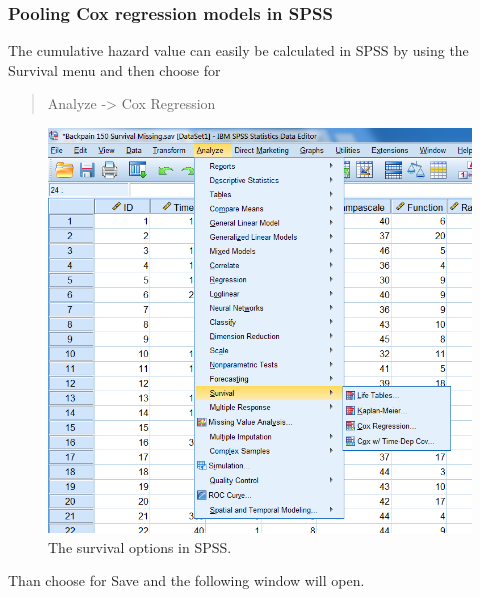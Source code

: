 \documentclass[]{book}
\begin{document}
\subsubsection{Pooling Cox regression models in
SPSS}\label{pooling-cox-regression-models-in-spss}

The cumulative hazard value can easily be calculated in SPSS by using
the Survival menu and then choose for

\begin{quote}
Analyze -\textgreater{} Cox Regression
\end{quote}

\begin{figure}

{\centering \includegraphics[width=0.9\linewidth]{images/fig5.5} 

}

\caption{The survival options in SPSS.}\label{fig:fig5-5}
\end{figure}

Than choose for Save and the following window will open.
\end{document}
